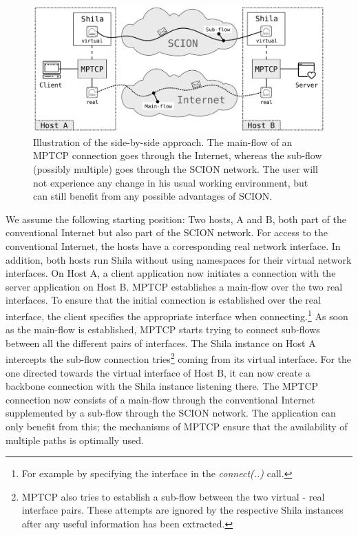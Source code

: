 \begin{figure}[H]
	\begin{center}
		\def\svgwidth{1\textwidth}
		\includegraphics[scale=0.24]{../illustrations/futureWork/SideBySide.pdf}   
		\caption[]{Illustration of the side-by-side approach. The main-flow of an MPTCP connection goes through the Internet, whereas the sub-flow (possibly multiple) goes through the SCION network. The user will not experience any change in his usual working environment, but can still benefit from any possible advantages of SCION.}
		\label{fig:SideBySide}
	\end{center}
\end{figure}

We assume the following starting position: Two hosts, A and B, both part of the conventional Internet but also part of the SCION network. For access to the conventional Internet, the hosts have a corresponding real network interface.  In addition, both hosts run Shila without using namespaces for their virtual network interfaces. On Host A, a client application now initiates a connection with the server application on Host B. MPTCP establishes a main-flow over the two real interfaces. To ensure that the initial connection is established over the real interface, the client specifies the appropriate interface when connecting.\footnote{For example by specifying the interface in the \textit{connect(..)} call.} As soon as the main-flow is established, MPTCP starts trying to connect sub-flows between all the different pairs of interfaces. The Shila instance on Host A intercepts the sub-flow connection tries\footnote{MPTCP also tries to establish a sub-flow between the two virtual - real interface pairs. These attempts are ignored by the respective Shila instances after any useful information has been extracted.} coming from its virtual interface. For the one directed towards the virtual interface of Host B, it can now create a backbone connection with the Shila instance listening there. The MPTCP connection now consists of a  main-flow through the conventional Internet supplemented by a sub-flow through the SCION network. The application can only benefit from this; the mechanisms of MPTCP ensure that the availability of multiple paths is optimally used.  